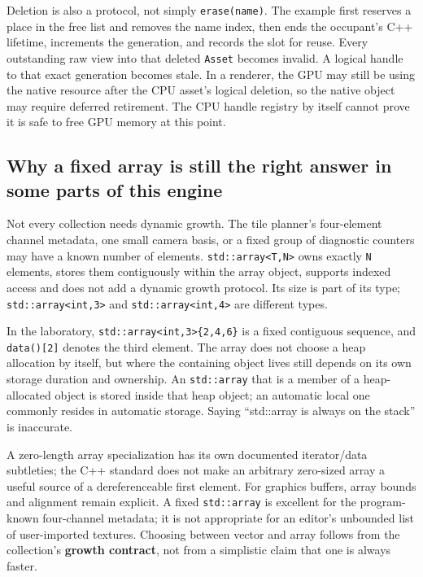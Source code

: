 Deletion is also a protocol, not simply \texttt{erase(name)}. The example first reserves a place in the free list and removes the name index, then ends the occupant's C++ lifetime, increments the generation, and records the slot for reuse. Every outstanding raw view into that deleted \texttt{Asset} becomes invalid. A logical handle to that exact generation becomes stale. In a renderer, the GPU may still be using the native resource after the CPU asset's logical deletion, so the native object may require deferred retirement. The CPU handle registry by itself cannot prove it is safe to free GPU memory at this point.

\subsection{Why a fixed array is still the right answer in some parts of this engine}\label{01-foundations-i-ch006-why-a-fixed-array-is-still-the-right-answer-in-some-parts-of-this-engine}

Not every collection needs dynamic growth. The tile planner's four-element channel metadata, one small camera basis, or a fixed group of diagnostic counters may have a known number of elements. \texttt{std::array\textless{}T,N\textgreater{}} owns exactly \texttt{N} elements, stores them contiguously within the array object, supports indexed access and does not add a dynamic growth protocol. Its size is part of its type; \texttt{std::array\textless{}int,3\textgreater{}} and \texttt{std::array\textless{}int,4\textgreater{}} are different types.

In the laboratory, \texttt{std::array\textless{}int,3\textgreater{}\{2,4,6\}} is a fixed contiguous sequence, and \texttt{data(){[}2{]}} denotes the third element. The array does not choose a heap allocation by itself, but where the containing object lives still depends on its own storage duration and ownership. An \texttt{std::array} that is a member of a heap-allocated object is stored inside that heap object; an automatic local one commonly resides in automatic storage. Saying ``std::array is always on the stack'' is inaccurate.

A zero-length array specialization has its own documented iterator/data subtleties; the C++ standard does not make an arbitrary zero-sized array a useful source of a dereferenceable first element. For graphics buffers, array bounds and alignment remain explicit. A fixed \texttt{std::array} is excellent for the program-known four-channel metadata; it is not appropriate for an editor's unbounded list of user-imported textures. Choosing between vector and array follows from the collection's \textbf{growth contract}, not from a simplistic claim that one is always faster.


